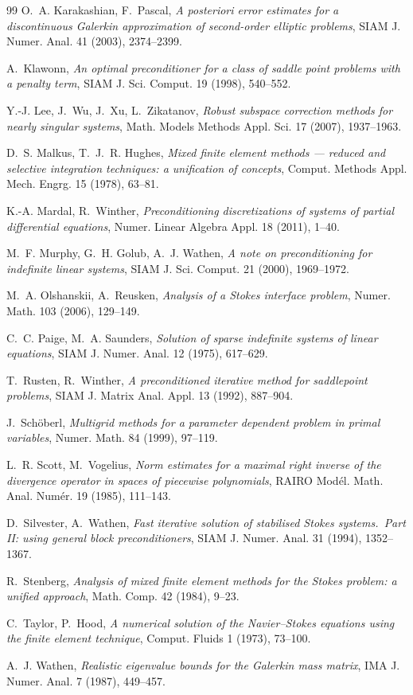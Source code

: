 \documentclass[11pt]{article}
\numberwithin{equation}{section}
\theoremstyle{remark}
\begin{document}
\begin{thebibliography}{99}
O.~A. Karakashian, F.~Pascal,
\emph{A posteriori error estimates for a discontinuous Galerkin
approximation of second-order elliptic problems},
SIAM J. Numer. Anal. 41 (2003), 2374--2399.

A.~Klawonn,
\emph{An optimal preconditioner for a class of saddle point problems
with a penalty term},
SIAM J. Sci. Comput. 19 (1998), 540--552.

Y.-J. Lee, J.~Wu, J.~Xu, L.~Zikatanov,
\emph{Robust subspace correction methods for nearly singular systems},
Math. Models Methods Appl. Sci. 17 (2007), 1937--1963.

D.~S. Malkus, T.~J.~R. Hughes,
\emph{Mixed finite element methods --- reduced and selective integration
techniques: a unification of concepts},
Comput. Methods Appl. Mech. Engrg. 15 (1978), 63--81.

K.-A. Mardal, R.~Winther,
\emph{Preconditioning discretizations of systems of partial differential
equations},
Numer. Linear Algebra Appl. 18 (2011), 1--40.

M.~F. Murphy, G.~H. Golub, A.~J. Wathen,
\emph{A note on preconditioning for indefinite linear systems},
SIAM J. Sci. Comput. 21 (2000), 1969--1972.

M.~A. Olshanskii, A.~Reusken,
\emph{Analysis of a Stokes interface problem},
Numer. Math. 103 (2006), 129--149.

C.~C. Paige, M.~A. Saunders,
\emph{Solution of sparse indefinite systems of linear equations},
SIAM J. Numer. Anal. 12 (1975), 617--629.

T.~Rusten, R.~Winther,
\emph{A preconditioned iterative method for saddlepoint problems},
SIAM J. Matrix Anal. Appl. 13 (1992), 887--904.

J.~Schöberl,
\emph{Multigrid methods for a parameter dependent problem in primal
variables},
Numer. Math. 84 (1999), 97--119.

L.~R. Scott, M.~Vogelius,
\emph{Norm estimates for a maximal right inverse of the divergence
operator in spaces of piecewise polynomials},
RAIRO Modél. Math. Anal. Numér. 19 (1985), 111--143.

D.~Silvester, A.~Wathen,
\emph{Fast iterative solution of stabilised Stokes systems.\ Part II:
using general block preconditioners},
SIAM J. Numer. Anal. 31 (1994), 1352--1367.

R.~Stenberg,
\emph{Analysis of mixed finite element methods for the Stokes problem: a
unified approach},
Math. Comp. 42 (1984), 9--23.

C.~Taylor, P.~Hood,
\emph{A numerical solution of the Navier--Stokes equations using the
finite element technique},
Comput. Fluids 1 (1973), 73--100.

A.~J. Wathen,
\emph{Realistic eigenvalue bounds for the Galerkin mass matrix},
IMA J. Numer. Anal. 7 (1987), 449--457.

\end{thebibliography}
\end{document}
